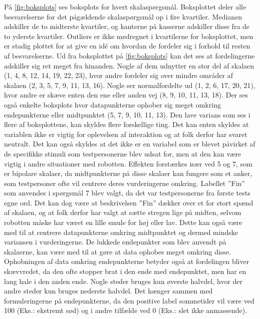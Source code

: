 På \autoref{fig:boksplots} ses boksplots for hvert skalaspørgsmål. Boksplottet deler alle besvarelserne for det pågældende skalaspørgsmål op i fire kvartiler. Medianen adskiller de to midterste kvartiler, og kanterne på kasserne adskiller disse fra de to yderste kvartiler. Outliers er ikke medregnet i kvartilerne for boksplottet, men er stadig plottet for at give en idé om hvordan de fordeler sig i forhold til resten af besvarelserne. \blankline
%
Ud fra boksplottet på \autoref{fig:boksplots} kan det ses at fordelingerne adskiller sig ret meget fra hinanden. Nogle af dem udnytter en stor del af skalaen (1, 4, 8, 12, 14, 19, 22, 23), hvor andre fordeler sig over mindre områder af skalaen (2, 3, 5, 7, 9, 11, 13, 16). Nogle ser normalfordelte ud (1, 2, 6, 17, 20, 21), hvor andre er skæve enten den ene eller anden vej (8, 9, 10, 11, 13, 18). Der ses også enkelte boksplots hvor datapunkterne ophober sig meget omkring endepunkterne eller midtpunktet (5, 7, 9, 10, 11, 13). \blankline
%
Den lave varians som ses i flere af boksplottene, kan skyldes flere forskellige ting. Det kan enten skyldes at variablen ikke er vigtig for oplevelsen af interaktion og at folk derfor har svaret neutralt. Det kan også skyldes at det ikke er en variabel som er blevet påvirket af de specifikke stimuli som testpersonerne blev udsat for, men at den kan være vigtig i andre situationer med robotten. Effekten forstærkes især ved 5 og 7, som er bipolare skalaer, da midtpunkterne på disse skalaer kan fungere som et anker, som testpersoner ofte vil centrere deres vurderingerne omkring. Labellet ”Fin” som anvendes i spørgsmål 7 blev valgt, da det var testpersonerne fra første tests egne ord. Det kan dog være at beskrivelsen ”Fin” dækker over et for stort spænd af skalaen, og at folk derfor har valgt at sætte stregen lige på midten, selvom robotten måske har været en lille smule for høj eller lav. Dette kan også være med til at centrere datapunkterne omkring midtpunktet og dermed mindske variansen i vurderingerne. \blankline
%
De lukkede endepunkter som blev anvendt på skalaerne, kan være med til at gøre at data ophobes meget omkring disse. Ophobningen af data omkring endepunkterne betyder også at fordelingen bliver skævvredet, da den ofte stopper brat i den ende med endepunktet, men har en lang hale i den anden ende.  \blankline
%
Nogle steder bruges kun øverste halvdel, hvor der andre steder kun bruges nederste halvdel. Det hænger sammen med formuleringerne på endepunkterne, da den positive label sommetider vil være ved 100 (Eks.: ekstremt sød) og i andre tilfælde ved 0 (Eks.: slet ikke anmassende).


